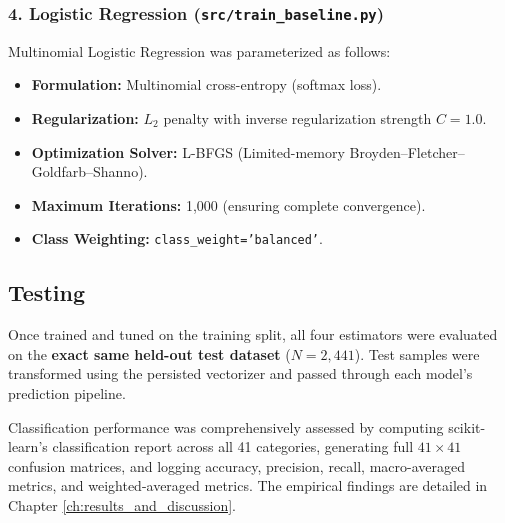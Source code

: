 \subsubsection*{4. Logistic Regression (\texttt{src/train\_baseline.py})}
Multinomial Logistic Regression was parameterized as follows:
\begin{itemize}
    \item \textbf{Formulation:} Multinomial cross-entropy (softmax loss).
    \item \textbf{Regularization:} $L_2$ penalty with inverse regularization strength $C = 1.0$.
    \item \textbf{Optimization Solver:} L-BFGS (Limited-memory Broyden--Fletcher--Goldfarb--Shanno).
    \item \textbf{Maximum Iterations:} 1,000 (ensuring complete convergence).
    \item \textbf{Class Weighting:} \texttt{class\_weight='balanced'}.
\end{itemize}

\subsection{Testing}
\label{subsec:testing}
Once trained and tuned on the training split, all four estimators were evaluated on the \textbf{exact same held-out test dataset} ($N = 2,441$). Test samples were transformed using the persisted vectorizer and passed through each model's prediction pipeline.

Classification performance was comprehensively assessed by computing scikit-learn's classification report across all 41 categories, generating full $41 \times 41$ confusion matrices, and logging accuracy, precision, recall, macro-averaged metrics, and weighted-averaged metrics. The empirical findings are detailed in Chapter \ref{ch:results_and_discussion}.
